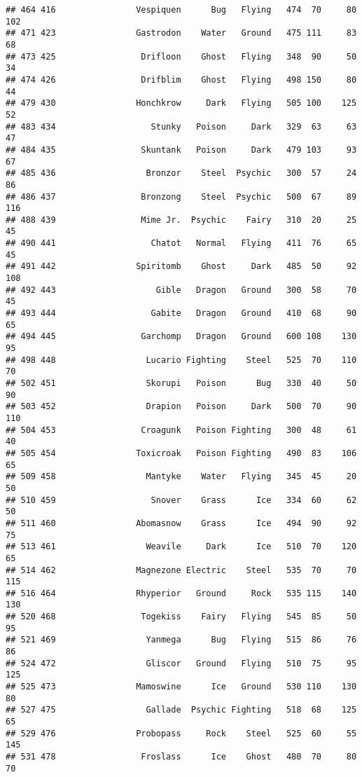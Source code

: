 \documentclass[
]{article}
\begin{document}
\begin{verbatim}
## 464 416                Vespiquen      Bug   Flying   474  70     80     102
## 471 423                Gastrodon    Water   Ground   475 111     83      68
## 473 425                 Drifloon    Ghost   Flying   348  90     50      34
## 474 426                 Drifblim    Ghost   Flying   498 150     80      44
## 479 430                Honchkrow     Dark   Flying   505 100    125      52
## 483 434                   Stunky   Poison     Dark   329  63     63      47
## 484 435                 Skuntank   Poison     Dark   479 103     93      67
## 485 436                  Bronzor    Steel  Psychic   300  57     24      86
## 486 437                 Bronzong    Steel  Psychic   500  67     89     116
## 488 439                 Mime Jr.  Psychic    Fairy   310  20     25      45
## 490 441                   Chatot   Normal   Flying   411  76     65      45
## 491 442                Spiritomb    Ghost     Dark   485  50     92     108
## 492 443                    Gible   Dragon   Ground   300  58     70      45
## 493 444                   Gabite   Dragon   Ground   410  68     90      65
## 494 445                 Garchomp   Dragon   Ground   600 108    130      95
## 498 448                  Lucario Fighting    Steel   525  70    110      70
## 502 451                  Skorupi   Poison      Bug   330  40     50      90
## 503 452                  Drapion   Poison     Dark   500  70     90     110
## 504 453                 Croagunk   Poison Fighting   300  48     61      40
## 505 454                Toxicroak   Poison Fighting   490  83    106      65
## 509 458                  Mantyke    Water   Flying   345  45     20      50
## 510 459                   Snover    Grass      Ice   334  60     62      50
## 511 460                Abomasnow    Grass      Ice   494  90     92      75
## 513 461                  Weavile     Dark      Ice   510  70    120      65
## 514 462                Magnezone Electric    Steel   535  70     70     115
## 516 464                Rhyperior   Ground     Rock   535 115    140     130
## 520 468                 Togekiss    Fairy   Flying   545  85     50      95
## 521 469                  Yanmega      Bug   Flying   515  86     76      86
## 524 472                  Gliscor   Ground   Flying   510  75     95     125
## 525 473                Mamoswine      Ice   Ground   530 110    130      80
## 527 475                  Gallade  Psychic Fighting   518  68    125      65
## 529 476                Probopass     Rock    Steel   525  60     55     145
## 531 478                 Froslass      Ice    Ghost   480  70     80      70

\end{verbatim}
\end{document}
